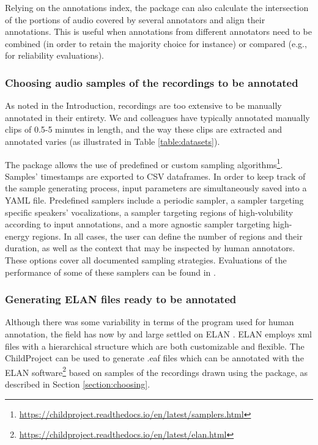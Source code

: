 \documentclass[smallextended]{svjour3}       %
\begin{document}
Relying on the annotations index, the package can also calculate the intersection of the portions of audio covered by several annotators and align their annotations. This is useful when annotations from different annotators need to be combined (in order to retain the majority choice for instance) or compared (e.g., for reliability evaluations).

\subsubsection*{Choosing audio samples of the recordings to be annotated}\label{section:choosing}

As noted in the Introduction, recordings are too extensive to be manually annotated in their entirety. We and colleagues have typically annotated manually clips of 0.5-5 minutes in length, and the way these clips are extracted and annotated varies (as illustrated in Table \ref{table:datasets}).

The package allows the use of predefined or custom sampling algorithms\footnote{\url{https://childproject.readthedocs.io/en/latest/samplers.html}}. Samples' timestamps are exported to CSV dataframes. In order to keep track of the sample generating process, input parameters are simultaneously saved into a YAML file. Predefined samplers include a periodic sampler, a sampler targeting specific speakers' vocalizations, a sampler targeting regions of high-volubility according to input annotations, and a more agnostic sampler targeting high-energy regions. In all cases, the user can define the number of regions and their duration, as well as the context that may be inspected by human annotators. These options cover all documented sampling strategies. Evaluations of the performance of some of these samplers can be found in \citep[Chapter 15, ``Human annotation'']{exelang-book}.

\subsubsection*{Generating ELAN files ready to be annotated}

Although there was some variability in terms of the program used for human annotation, the field has now by and large settled on ELAN \citep{wittenburg2006elan}. ELAN employs xml files with a hierarchical structure which are both customizable and flexible. The ChildProject can be used to generate .eaf files which can be annotated with the ELAN software\footnote{\url{https://childproject.readthedocs.io/en/latest/elan.html}} based on samples of the recordings drawn using the package, as described in Section \ref{section:choosing}.
\end{document}
